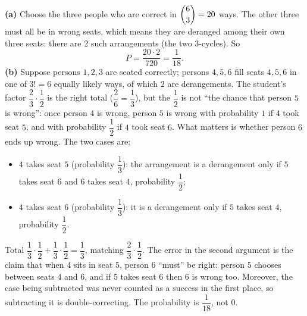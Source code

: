 \textbf{(a)} Choose the three people who are correct in $\dbinom63=20$ ways. The other three must all be in wrong seats, which means they are deranged among their own three seats: there are $2$ such arrangements (the two $3$-cycles). So
\[
P=\dfrac{20\cdot2}{720}=\boxed{\dfrac{1}{18}}.
\]
\textbf{(b)} Suppose persons $1,2,3$ are seated correctly; persons $4,5,6$ fill seats $4,5,6$ in one of $3!=6$ equally likely ways, of which $2$ are derangements. The student's factor $\dfrac{2}{3}\cdot\dfrac{1}{2}$ is the right total ($\dfrac{2}{6}=\dfrac{1}{3}$), but the $\dfrac{1}{2}$ is not ``the chance that person $5$ is wrong'': once person $4$ is wrong, person $5$ is wrong with probability $1$ if $4$ took seat $5$, and with probability $\dfrac{1}{2}$ if $4$ took seat $6$. What matters is whether person $6$ ends up wrong. The two cases are:
\begin{itemize}
\item $4$ takes seat $5$ (probability $\dfrac{1}{3}$): the arrangement is a derangement only if $5$ takes seat $6$ and $6$ takes seat $4$, probability $\dfrac{1}{2}$;
\item $4$ takes seat $6$ (probability $\dfrac{1}{3}$): it is a derangement only if $5$ takes seat $4$, probability $\dfrac{1}{2}$.
\end{itemize}
Total $\dfrac{1}{3}\cdot\dfrac{1}{2}+\dfrac{1}{3}\cdot\dfrac{1}{2}=\dfrac{1}{3}$, matching $\dfrac{2}{3}\cdot\dfrac{1}{2}$. The error in the second argument is the claim that when $4$ sits in seat $5$, person $6$ ``must'' be right: person $5$ chooses between seats $4$ and $6$, and if $5$ takes seat $6$ then $6$ is wrong too. Moreover, the case being subtracted was never counted as a success in the first place, so subtracting it is double-correcting. The probability is $\dfrac{1}{18}$, not $0$.
